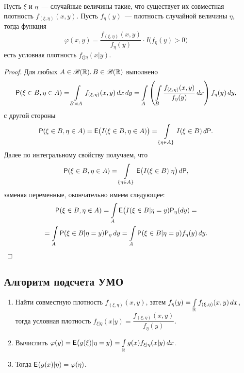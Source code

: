  \begin{theorem}
 	Пусть $\xi$ и $\eta$~--- случайные величины такие, что существует их совместная плотность $f_{(\xi, \eta)} (x, y)$. Пусть $f_\eta (y)$~--- плотность случайной величины $\eta$, тогда функция $$\varphi(x, y) = \dfrac{f_{(\xi, \eta)} (x, y)}{f_\eta (y)} \cdot I \big(f_\eta(y) > 0 \big)$$ есть условная плотность $f_{\xi |\eta} (x | y)$.
 	\begin{proof}
 		Для любых $A \in \B(\R), B \in \B(\R)$ выполнено
 		\begin{multline*}
 			\P(\xi \in B, \eta \in A) = \int\limits_{B \rtimes A} f_{(\xi, \eta)} (x, y) \, dx \, dy = \int\limits_A \left( \int\limits_B \dfrac{f_{(\xi, \eta)} (x, y)}{f_\eta(y)} \, dx \right) f_\eta(y) \, dy,
 		\end{multline*}
 		с другой стороны
 		\begin{equation*}
 			\P( \xi \in B, \eta \in A) = \E \big( I (\xi \in B, \eta \in A) \big) = \int\limits_{\{\eta \in A \}} I(\xi \in B) \, d\P.
 		\end{equation*}
 		Далее по интегральному свойству получаем, что
 		\begin{equation*}
 			\P( \xi \in B, \eta \in A) = \int\limits_{\{\eta \in A \}} \E  \big( I(\xi \in B) | \eta \big) \, d\P,
 		\end{equation*}
 		заменяя переменные, окончательно имеем следующее:
 		\begin{multline*}
 			\P( \xi \in B, \eta \in A) = \int\limits_A \E \big( I (\xi \in B | \eta = y) \P_\eta(d y) =\\= \int\limits_A \P(\xi \in B | \eta = y) \P_\eta \, dy = \int\limits_A \P( \xi \in B | \eta = y) f_\eta (y) \, dy.
 		\end{multline*}
 	\end{proof}
 \end{theorem}
 \subsection*{Алгоритм подсчета УМО}
 \begin{enumerate}
 	\item {Найти совместную плотность $f_{(\xi, \eta)} (x, y)$, затем $f_\eta (y) = \int\limits_\R f_{(\xi, \eta)} (x, y) \, dx$, тогда условная плотность $f_{ \xi | \eta } (x | y) = \dfrac{f_{(\xi, \eta)} (x, y)}{f_\eta (y)}$.}
 	\item {Вычислить $\varphi(y) = \E \big( g(\xi) | \eta = y \big) = \int\limits_\R g(x) f_{ \xi | \eta } (x | y) \, dx $.}
 	\item {Тогда $\E  \big( g(x) | \eta) = \varphi(\eta)$.}
 \end{enumerate}
